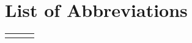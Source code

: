 
\tableofcontents
\cleardoublepage{}


\newpage
\listoffigures
\cleardoublepage{}

\chapter*{List of Abbreviations}
\begin{center}
  \begin{tabular}{lll}
    \hspace*{2em} & \hspace*{1in} & \hspace*{4.5in} \\
    
  \end{tabular}
\end{center}
\cleardoublepage{}


\newpage
\endofprelim{}